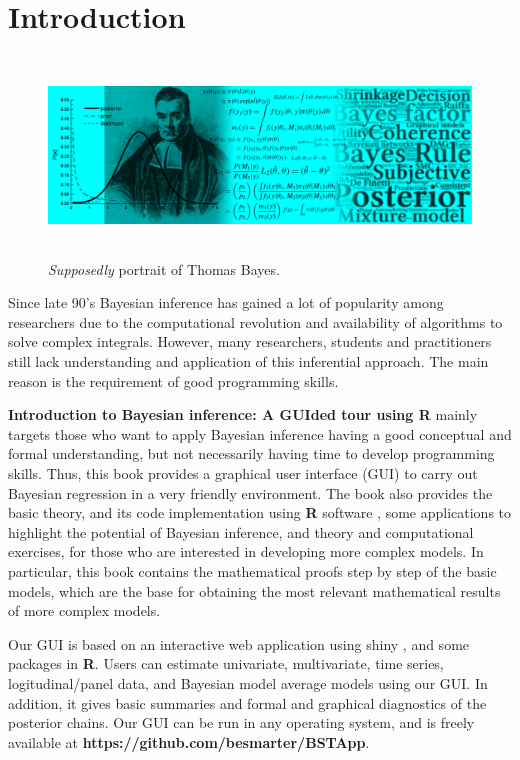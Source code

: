 \chapter*{Introduction}
\begin{figure}[h]
	\includegraphics[width=340pt, height=150pt]{frontmatter/figures/BannerBook.jpg}
	\caption[List of figure caption goes here]{\textit{Supposedly} portrait of Thomas Bayes.}\label{fig01}
\end{figure}

Since late 90’s Bayesian inference has gained a lot of popularity among researchers due to the computational revolution and availability of algorithms to solve complex integrals. However, many researchers, students and practitioners still lack understanding and application of this inferential approach. The main reason is the requirement of good programming skills.

\textbf{Introduction to Bayesian inference: A GUIded tour using R} mainly targets those who want to apply Bayesian inference having a good conceptual and formal understanding, but not necessarily having time to develop programming skills. Thus, this book provides a graphical user interface (GUI) to carry out Bayesian regression in a very friendly environment. The book also provides the basic theory, and its code implementation using \textbf{R} software \cite{R2021}, some applications to highlight the potential of Bayesian inference, and theory and computational exercises, for those who are interested in developing more complex models. In particular, this book contains the mathematical proofs step by step of the basic models, which are the base for obtaining the most relevant mathematical results of more complex models.

Our GUI is based on an interactive web application using shiny \cite{Chang2018}, and some packages in \textbf{R}. Users can estimate univariate, multivariate, time series, logitudinal/panel data, and Bayesian model average models using our GUI. In addition, it gives basic summaries and formal and graphical diagnostics of the posterior chains. Our GUI can be run in any operating system, and is freely available at \textbf{https://github.com/besmarter/BSTApp}. 

